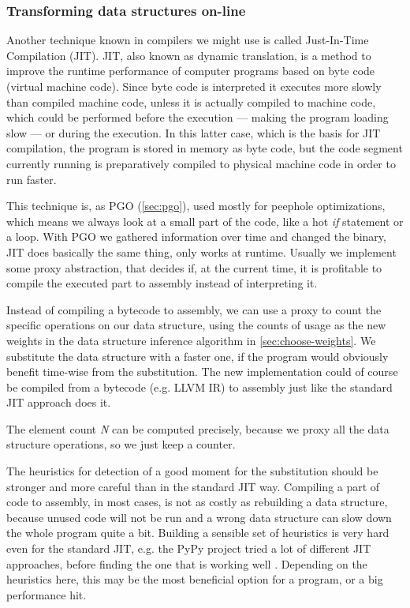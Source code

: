 \documentclass[a4paper,11pt]{article}
\begin{document}
		\subsubsection{Transforming data structures on-line} \label{sec:transforming-on-line}

            Another technique known in compilers we might use is called Just-In-Time Compilation (JIT). JIT, also known
            as dynamic translation, is a method to improve the runtime performance of computer programs based on byte
            code (virtual machine code). Since byte code is interpreted it executes more slowly than compiled machine
            code, unless it is actually compiled to machine code, which could be performed before the execution –-- making
            the program loading slow –-- or during the execution. In this latter case, which is the basis for JIT
            compilation, the program is stored in memory as byte code, but the code segment currently running is
            preparatively compiled to physical machine code in order to run faster.\cite{Wijit}

            This technique is, as PGO (\autoref{sec:pgo}), used mostly for peephole optimizations, which means we always
            look at a small part of the code, like a hot \emph{if} statement or a loop. With PGO we gathered information
            over time and changed the binary, JIT does basically the same thing, only works at runtime. Usually we
            implement some proxy abstraction, that decides if, at the current time, it is profitable to compile the
            executed part to assembly instead of interpreting it.

            Instead of compiling a bytecode to assembly, we can use a proxy to count the specific operations on our
            data structure, using the counts of usage as the new weights in the data structure inference algorithm in
            \autoref{sec:choose-weights}. We substitute the data structure with a faster one, if the program would
            obviously benefit time-wise from the substitution. The new implementation could of course be compiled from a
            bytecode (e.g. LLVM IR) to assembly just like the standard JIT approach does it.

            The element count \emph{N} can be computed precisely, because we proxy all the data structure operations, so we
            just keep a counter.

            The heuristics for detection of a good moment for the substitution should be stronger and more careful than
            in the standard JIT way. Compiling a part of code to assembly, in most cases, is not as costly as
            rebuilding a data structure, because unused code will not be run and a wrong data structure can slow down the
            whole program quite a bit. Building a sensible set of heuristics is very hard even for the standard JIT,
            e.g. the PyPy project tried a lot of different JIT approaches, before finding the one that is working well \cite{PyPy}.
            Depending on the heuristics here, this may be the most beneficial option for a program, or a big performance
            hit.
\end{document}
